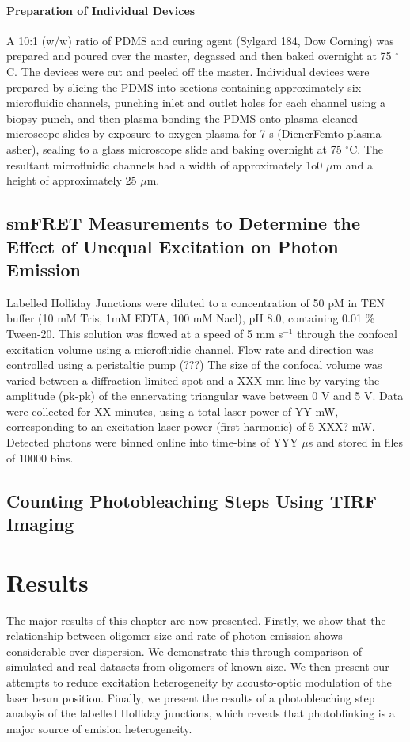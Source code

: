 \paragraph{Preparation of Individual Devices}
A 10:1 (w/w) ratio of PDMS and curing agent (Sylgard 184, Dow Corning) was prepared and poured over the master, degassed and then baked overnight at 75 $^{\circ}$C. The devices were cut and peeled off the master. Individual devices were prepared by slicing the PDMS into sections containing approximately six microfluidic channels, punching inlet and outlet holes for each channel using a biopsy punch, and then plasma bonding the PDMS onto plasma-cleaned microscope slides by exposure to oxygen plasma for 7 s (DienerFemto plasma asher), sealing to a glass microscope slide and baking overnight at 75 $^{\circ}$C. The resultant microfluidic channels had a width of approximately 1o0 $\mu$m and a height of approximately 25 $\mu$m.

\subsection{smFRET Measurements to Determine the Effect of Unequal Excitation on Photon Emission}
Labelled Holliday Junctions were diluted to a concentration of 50 pM in TEN buffer (10 mM Tris, 1mM EDTA, 100 mM Nacl), pH 8.0, containing 0.01 \% Tween-20. This solution was flowed at a speed of 5 mm s$^{-1}$ through the confocal excitation volume using a microfluidic channel. Flow rate and direction was controlled using a peristaltic pump (???) The size of the confocal volume was varied between a diffraction-limited spot and a XXX mm line by varying the amplitude (pk-pk) of the ennervating triangular wave between 0 V and 5 V. Data were collected for XX minutes, using a total laser power of YY mW, corresponding to an excitation laser power (first harmonic) of 5-XXX? mW. Detected photons were binned online into time-bins of YYY $\mu$s and stored in files of 10000 bins.   

\subsection{Counting Photobleaching Steps Using TIRF Imaging}

\section{Results}
The major results of this chapter are now presented. Firstly, we show that the relationship between oligomer size and rate of photon emission shows considerable over-dispersion. We demonstrate this through comparison of simulated and real datasets from oligomers of known size. We then present our attempts to reduce excitation heterogeneity by acousto-optic modulation of the laser beam position. Finally, we present the results of a photobleaching step analsyis of the labelled Holliday junctions, which reveals that photoblinking is a major source of emision heterogeneity.

